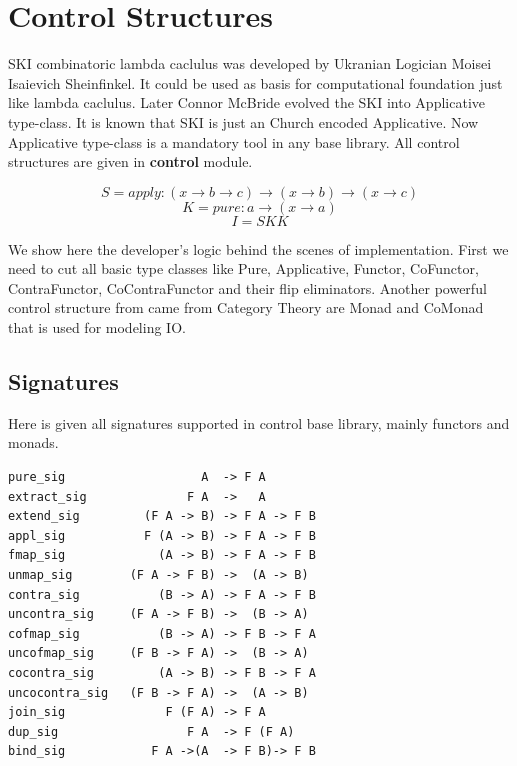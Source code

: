 \documentclass{article}
\begin{document}
\newpage
\section{Control Structures}

SKI combinatoric lambda caclulus was developed by Ukranian Logician
Moisei Isaievich Sheinfinkel. It could be used as basis for computational
foundation just like lambda caclulus. Later Connor McBride \cite{McBride08} evolved the SKI
into Applicative type-class. It is known that SKI is just an Church encoded Applicative.
Now Applicative type-class is a mandatory tool in any base library.
All control structures are given in {\bf control} module.

\begin{equation}
 S = apply : (x \rightarrow b \rightarrow c) \rightarrow (x \rightarrow b) \rightarrow (x \rightarrow c)
\end{equation}
\begin{equation}
 K = pure  : a \rightarrow (x \rightarrow a)
\end{equation}
\begin{equation}
 I = S K K
\end{equation}

We show here the developer's logic behind the scenes of implementation. First we need
to cut all basic type classes like Pure, Applicative, Functor, CoFunctor,
ContraFunctor, CoContraFunctor and their flip eliminators. Another powerful control
structure from came from Category Theory are Monad and CoMonad that is used
for modeling IO.

\subsection{Signatures}

Here is given all signatures supported in control base library, mainly functors and monads.

\begin{lstlisting}[mathescape=true]
pure_sig                   A  -> F A
extract_sig              F A  ->   A
extend_sig         (F A -> B) -> F A -> F B
appl_sig           F (A -> B) -> F A -> F B
fmap_sig             (A -> B) -> F A -> F B
unmap_sig        (F A -> F B) ->  (A -> B)
contra_sig           (B -> A) -> F A -> F B
uncontra_sig     (F A -> F B) ->  (B -> A)
cofmap_sig           (B -> A) -> F B -> F A
uncofmap_sig     (F B -> F A) ->  (B -> A)
cocontra_sig         (A -> B) -> F B -> F A
uncocontra_sig   (F B -> F A) ->  (A -> B)
join_sig              F (F A) -> F A
dup_sig                  F A  -> F (F A)
bind_sig            F A ->(A  -> F B)-> F B
\end{lstlisting}
\end{document}
